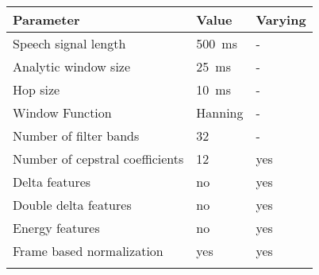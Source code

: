 \begin{table}[ht!]
\scriptsize
\begin{center}
\begin{tabular}{ M{4cm}  M{1.5cm} M{1.5cm}}
\toprule
\textbf{Parameter} & \textbf{Value} & \textbf{Varying} \\
\midrule
Speech signal length & \SI{500}{\milli\second} & - \\
Analytic window size & \SI{25}{\milli\second} & -\\
Hop size & \SI{10}{\milli\second} & -\\
Window Function & Hanning & -\\
\midrule
Number of filter bands & 32 & -\\
Number of cepstral coefficients & 12 & yes\\
Delta features & no & yes \\
Double delta features & no & yes \\
Energy features & no 	& yes \\
Frame based normalization & yes & yes\\
\bottomrule
\label{tab:exp_details_params_feature}
\end{tabular}
\end{center}
\end{table}